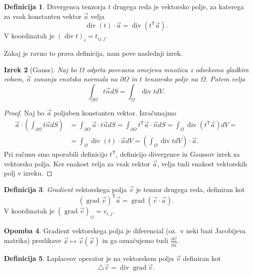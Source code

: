 \documentclass[12pt,a4paper,twoside]{article}
\theoremstyle{definition} %
\newtheorem{definicija}{Definicija}[section]
\newtheorem{opomba}[definicija]{Opomba}
\theoremstyle{plain} %
\newtheorem{izrek}[definicija]{Izrek}
\numberwithin{equation}{section}
\newcommand{\T}{\mathsf{T}}
\newcommand{\lap}{\triangle}
\renewcommand{\div}{\operatorname{div}}
\newcommand{\grad}{\operatorname{grad}}
\newcommand{\dpar}[2]{\ensuremath{\frac{\partial #1}{\partial #2}}}
\newcommand{\vv}{\vec{v}}
\newcommand{\va}{\vec{a}}
\newcommand{\vn}{\vec{n}}
\newcommand{\vx}{\vec{x}}
\begin{document}
\begin{definicija}
  Divergenca tenzorja $t$ drugega reda je vektorsko polje, za katerega za vsak
  konstanten vektor $\va$ velja
  \begin{equation}
    \div(t)\cdot \va = \div(t^\T \va).
  \end{equation}
  V koordinatah je $(\div t)_i = t_{ij,j}$.
\end{definicija}

Zakaj je ravno to prava definicija, nam pove naslednji izrek.
\begin{izrek}[Gauss]
  \label{izr:gauss}
  Naj bo $\Omega$ odprta povezana omejena množica z odsekoma gladkim robom, $\vn$ zunanja enotska
  normala na $\partial \Omega$ in $t$ tenzorsko polje na $\Omega$. Potem velja
  \begin{equation}
    \int_{\partial \Omega} t\vn dS = \int_{\Omega} \div t dV.
  \end{equation}
\end{izrek}
\begin{proof}
Naj bo $\va$ poljuben konstanten vektor. Izračunajmo
\begin{align*}
  \va \cdot \left( \int_{\partial \Omega} t\vn dS \right) &=
  \int_{\partial \Omega}\va \cdot t\vn dS =
  \int_{\partial \Omega}t^\T \va \cdot \vn dS =
  \int_{\Omega}\div(t^\T \va) dV = \\ &=
  \int_{\Omega}\div(t) \cdot \va dV =
  \left(\int_{\Omega}\div t dV\right) \cdot \va.
\end{align*}
Pri računu smo uporabili definicijo $t^\T$, definicijo divergence in Gaussov
izrek za vektorska polja. Ker enakost velja za vsak vektor $\va$, velja tudi
enakost vektorskih polj v izreku.
\end{proof}

\begin{definicija}
  \emph{Gradient} vektorskega polja $\vv$ je tenzor drugega reda, definiran kot
  \begin{equation}
    (\grad\vv)^\T \va = \grad(\vv\cdot\va).
  \end{equation}
  V koordinatah je $(\grad\vv)_{ij} = v_{i,j}$.
\end{definicija}
\begin{opomba}
  Gradient vektorskega polja je diferencial (oz.~v neki bazi Jacobijeva matrika)
  preslikave $\vx \mapsto \vv(\vx)$ in ga označujemo tudi $\dpar{\vv}{\vx}$.
\end{opomba}

\begin{definicija}
  Laplaceov operator je na vektorskem polju $\vv$ definiran kot
  \begin{equation}
    \lap \vv = \div\grad \vv.
  \end{equation}
\end{definicija}
\end{document}
